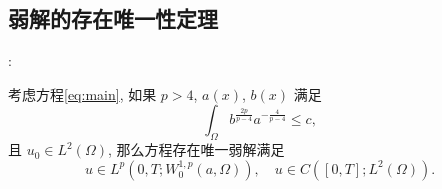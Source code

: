 \documentclass[UTF8]{ctexbeamer}
\newcommand*\abs[1]{\lvert#1\rvert}
\begin{document}
\subsection{弱解的存在唯一性定理}
\begin{frame}{\secname : \subsecname}
    \begin{theorem}\label{thm:absorb}
        考虑方程\eqref{eq:main}, 如果 $p>4$, $a(x)$, $b(x)$ 满足
        \begin{equation*}
            \int_{\Omega} b^{\frac{2p}{p-4}}a^{-\frac{4}{p-4}} \leq c,
        \end{equation*}
        且 $u_0 \in L^2(\Omega) $, 那么方程存在唯一弱解满足
        \begin{equation*}
            u \in L^p(0, T; W_0^{1,p}(a,\Omega)), \quad u \in C([0, T]; L^2(\Omega)).
        \end{equation*}
    \end{theorem}
\end{frame}
\end{document}
